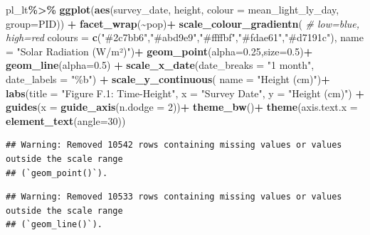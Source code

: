 \documentclass[
]{article}
\newenvironment{Shaded}{\begin{snugshade}}{\end{snugshade}}
\newcommand{\AttributeTok}[1]{\textcolor[rgb]{0.13,0.29,0.53}{#1}}
\newcommand{\CommentTok}[1]{\textcolor[rgb]{0.56,0.35,0.01}{\textit{#1}}}
\newcommand{\DecValTok}[1]{\textcolor[rgb]{0.00,0.00,0.81}{#1}}
\newcommand{\FloatTok}[1]{\textcolor[rgb]{0.00,0.00,0.81}{#1}}
\newcommand{\FunctionTok}[1]{\textcolor[rgb]{0.13,0.29,0.53}{\textbf{#1}}}
\newcommand{\NormalTok}[1]{#1}
\newcommand{\SpecialCharTok}[1]{\textcolor[rgb]{0.81,0.36,0.00}{\textbf{#1}}}
\newcommand{\StringTok}[1]{\textcolor[rgb]{0.31,0.60,0.02}{#1}}
\begin{document}
\begin{Shaded}
\begin{Highlighting}[]
\NormalTok{pl\_lt}\SpecialCharTok{\%\textgreater{}\%}
  \FunctionTok{ggplot}\NormalTok{(}\FunctionTok{aes}\NormalTok{(survey\_date, height, }\AttributeTok{colour =}\NormalTok{ mean\_light\_ly\_day, }\AttributeTok{group=}\NormalTok{PID)) }\SpecialCharTok{+}
  \FunctionTok{facet\_wrap}\NormalTok{(}\SpecialCharTok{\textasciitilde{}}\NormalTok{pop)}\SpecialCharTok{+}
  \FunctionTok{scale\_colour\_gradientn}\NormalTok{(                         }\CommentTok{\# low=blue, high=red}
    \AttributeTok{colours =} \FunctionTok{c}\NormalTok{(}\StringTok{"\#2c7bb6"}\NormalTok{,}\StringTok{"\#abd9e9"}\NormalTok{,}\StringTok{"\#ffffbf"}\NormalTok{,}\StringTok{"\#fdae61"}\NormalTok{,}\StringTok{"\#d7191c"}\NormalTok{),}
    \AttributeTok{name =} \StringTok{"Solar Radiation (W/m²)"}\NormalTok{)}\SpecialCharTok{+}
  \FunctionTok{geom\_point}\NormalTok{(}\AttributeTok{alpha=}\FloatTok{0.25}\NormalTok{,}\AttributeTok{size=}\FloatTok{0.5}\NormalTok{)}\SpecialCharTok{+}
  \FunctionTok{geom\_line}\NormalTok{(}\AttributeTok{alpha=}\FloatTok{0.5}\NormalTok{) }\SpecialCharTok{+}
  \FunctionTok{scale\_x\_date}\NormalTok{(}\AttributeTok{date\_breaks =} \StringTok{"1 month"}\NormalTok{, }\AttributeTok{date\_labels =} \StringTok{"\%b"}\NormalTok{) }\SpecialCharTok{+}
   \FunctionTok{scale\_y\_continuous}\NormalTok{(}
    \AttributeTok{name =} \StringTok{"Height (cm)"}\NormalTok{)}\SpecialCharTok{+}
  \FunctionTok{labs}\NormalTok{(}\AttributeTok{title =} \StringTok{"Figure F.1: Time{-}Height"}\NormalTok{,}
       \AttributeTok{x =} \StringTok{"Survey Date"}\NormalTok{,}
       \AttributeTok{y =} \StringTok{"Height (cm)"}\NormalTok{) }\SpecialCharTok{+}
  \FunctionTok{guides}\NormalTok{(}\AttributeTok{x =} \FunctionTok{guide\_axis}\NormalTok{(}\AttributeTok{n.dodge =} \DecValTok{2}\NormalTok{))}\SpecialCharTok{+}
  \FunctionTok{theme\_bw}\NormalTok{()}\SpecialCharTok{+}
  \FunctionTok{theme}\NormalTok{(}\AttributeTok{axis.text.x =} \FunctionTok{element\_text}\NormalTok{(}\AttributeTok{angle=}\DecValTok{30}\NormalTok{))}
\end{Highlighting}
\end{Shaded}

\begin{verbatim}
## Warning: Removed 10542 rows containing missing values or values outside the scale range
## (`geom_point()`).
\end{verbatim}

\begin{verbatim}
## Warning: Removed 10533 rows containing missing values or values outside the scale range
## (`geom_line()`).
\end{verbatim}
\end{document}
